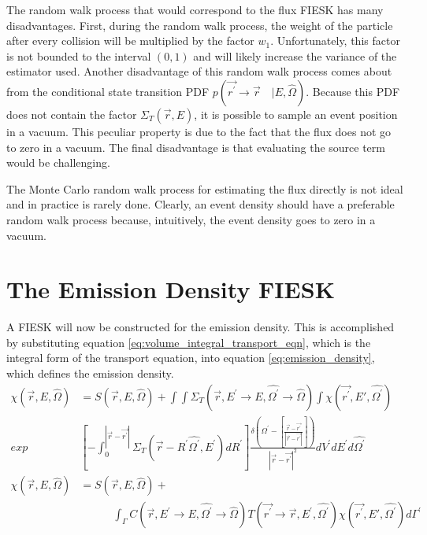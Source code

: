 The random walk process that would correspond to the flux FIESK has many
disadvantages. First, during the random walk process, the weight of the 
particle after every collision will be multiplied by the factor $w_1$. 
Unfortunately, this factor is not bounded to the interval $(0,1)$ and will 
likely increase the variance of the estimator used. Another disadvantage of 
this random walk process comes about from the conditional state transition PDF 
$p(\vec{r^{'}} \to \vec{r}\quad| E,\hat{\Omega})$. Because this PDF does not 
contain the factor $\Sigma_T(\vec{r},E)$, it is possible to sample an event 
position in a vacuum. This peculiar property is due to the fact that the flux 
does not go to zero in a vacuum. The final disadvantage is that evaluating the 
source term would be challenging.

The Monte Carlo random walk process for estimating the flux directly is not 
ideal and in practice is rarely done. Clearly, an event density should have
a preferable random walk process because, intuitively, the event density
goes to zero in a vacuum. 

\section{The Emission Density FIESK}
A FIESK will now be constructed for the emission density. This is accomplished 
by substituting equation \ref{eq:volume_integral_transport_eqn}, which is the
integral form of the transport equation, into equation 
\ref{eq:emission_density}, which defines the emission density. 
\begin{align}
    \chi(\vec{r},E,\hat{\Omega}) & = S(\vec{r},E,\hat{\Omega}) +
    \int\int \Sigma_T(\vec{r},E^{'} \to E, \hat{\Omega^{'}} \to \hat{\Omega})
    \int \chi(\vec{r^{'}},E',\hat{\Omega^{'}}) \nonumber \\
    exp&\left[-\int_0^{|\vec{r} - \vec{r^{'}}|} 
      \Sigma_T(\vec{r}-R^{'}\hat{\Omega^{'}},E^{'})dR^{'} \right]
    \frac{\delta \left(\Omega^{'} - \left[\frac{\vec{r} - \vec{r^{'}}}
        {|\vec{r} - \vec{r^{'}}|}\right]\right)}
    {|\vec{r} - \vec{r^{'}}|^2} dV^{'}dE^{'}d\hat{\Omega^{'}} \nonumber \\
    \chi(\vec{r},E,\hat{\Omega}) & = S(\vec{r},E,\hat{\Omega}) + \nonumber \\
    & \qquad \quad
    \int_{\Gamma}C(\vec{r},E^{'} \to E,\hat{\Omega^{'}} \to \hat{\Omega})
    T(\vec{r^{'}} \to \vec{r},E^{'},\hat{\Omega^{'}}) 
    \chi(\vec{r^{'}},E',\hat{\Omega^{'}}) d\Gamma^{'}
  \label{eq:emission_density_integral_eqn}
\end{align}

